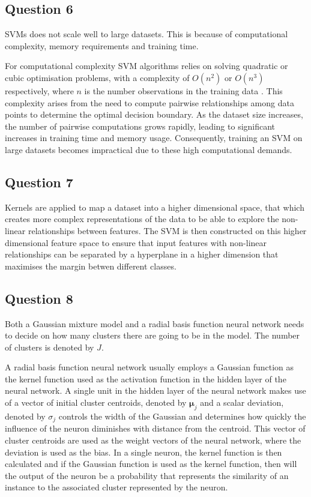 \documentclass[10pt]{article}
\begin{document}
\subsection*{Question 6}

SVMs does not scale well to large datasets. This is because of computational
complexity, memory requirements and training time.

For computational complexity SVM algorithms relies on solving quadratic or cubic optimisation problems, with a complexity of
$O(n^2)$ or $O(n^3)$ respectively, where $n$ is the number observations in the training data \cite{JMLR:2013}. This complexity arises from the need
to compute pairwise relationships among data points to determine the optimal decision boundary.
As the dataset size increases, the number of pairwise computations grows rapidly, leading to significant increases in training time and memory usage.
Consequently, training an SVM on large datasets becomes impractical due to these high computational demands.

\subsection*{Question 7}

Kernels are applied to map a dataset into a higher dimensional space, that which creates more complex representations of the data
to be able to explore the non-linear relationships between features. The SVM is then constructed
on this higher dimensional feature space to ensure that input features with non-linear relationships can be
separated by a hyperplane in a higher dimension that maximises the margin betwen different classes.

\subsection*{Question 8}

Both a Gaussian mixture model and a radial basis function neural network needs to decide on how
many clusters there are going to be in the model. The number of clusters is denoted by $J$.

A radial basis function neural network usually employs a Gaussian function as the kernel function used as the
activation function in the hidden layer of the neural network.
A single unit in the hidden layer of the neural network
makes use of a vector of initial cluster centroids, denoted by $\boldsymbol{\mu}_j$ and a scalar deviation, denoted
by $\sigma_j$ controls the width of the Gaussian and determines how quickly the influence of the neuron diminishes with distance from the centroid.
This vector of cluster centroids are used as the weight vectors of the neural network, where
the deviation is used as the bias. In a single neuron, the kernel function is then calculated and if the Gaussian function is used
as the kernel function, then will the output of the neuron be a probability that represents the similarity of an instance
to the associated cluster represented by the neuron.
\end{document}
